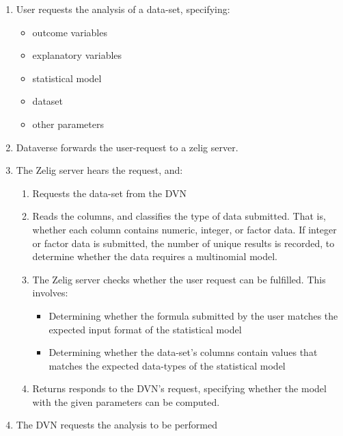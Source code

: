 \documentclass{article}
\begin{document}
\begin{enumerate}
  \item User requests the analysis of a data-set, specifying:
    \begin{itemize}
      \item outcome variables
      \item explanatory variables
      \item statistical model
      \item dataset
      \item other parameters
    \end{itemize}

  \item Dataverse forwards the user-request to a zelig server.

  \item The Zelig server hears the request, and:
    \begin{enumerate}
      \item Requests the data-set from the DVN
      \item Reads the columns, and classifies the type of data submitted. That
        is, whether each column contains numeric, integer, or factor data. If 
        integer or factor data is submitted, the number of unique results is
        recorded, to determine whether the data requires a multinomial model.
      \item The Zelig server checks whether the user request can be fulfilled.
        This involves:
        \begin{itemize}
          \item Determining whether the formula submitted by the user matches 
            the expected input format of the statistical model
          \item Determining whether the data-set's columns contain values that
            matches the expected data-types of the statistical model
        \end{itemize}
      \item Returns responds to the DVN's request, specifying whether the model
        with the given parameters can be computed.
    \end{enumerate}
    
  \item The DVN requests the analysis to be performed


\end{enumerate}
\end{document}
